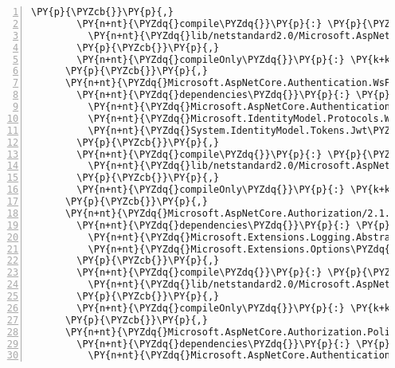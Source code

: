 \begin{Verbatim}[commandchars=\\\{\},numbers=left,firstnumber=1,stepnumber=1,numberblanklines=0]
        \PY{p}{\PYZcb{}}\PY{p}{,}
        \PY{n+nt}{\PYZdq{}compile\PYZdq{}}\PY{p}{:} \PY{p}{\PYZob{}}
          \PY{n+nt}{\PYZdq{}lib/netstandard2.0/Microsoft.AspNetCore.Authentication.Twitter.dll\PYZdq{}}\PY{p}{:} \PY{p}{\PYZob{}}\PY{p}{\PYZcb{}}
        \PY{p}{\PYZcb{}}\PY{p}{,}
        \PY{n+nt}{\PYZdq{}compileOnly\PYZdq{}}\PY{p}{:} \PY{k+kc}{true}
      \PY{p}{\PYZcb{}}\PY{p}{,}
      \PY{n+nt}{\PYZdq{}Microsoft.AspNetCore.Authentication.WsFederation/2.1.0\PYZhy{}rc1\PYZhy{}final\PYZdq{}}\PY{p}{:} \PY{p}{\PYZob{}}
        \PY{n+nt}{\PYZdq{}dependencies\PYZdq{}}\PY{p}{:} \PY{p}{\PYZob{}}
          \PY{n+nt}{\PYZdq{}Microsoft.AspNetCore.Authentication\PYZdq{}}\PY{p}{:} \PY{l+s+s2}{\PYZdq{}2.1.0\PYZhy{}rc1\PYZhy{}final\PYZdq{}}\PY{p}{,}
          \PY{n+nt}{\PYZdq{}Microsoft.IdentityModel.Protocols.WsFederation\PYZdq{}}\PY{p}{:} \PY{l+s+s2}{\PYZdq{}5.2.0\PYZdq{}}\PY{p}{,}
          \PY{n+nt}{\PYZdq{}System.IdentityModel.Tokens.Jwt\PYZdq{}}\PY{p}{:} \PY{l+s+s2}{\PYZdq{}5.2.0\PYZdq{}}
        \PY{p}{\PYZcb{}}\PY{p}{,}
        \PY{n+nt}{\PYZdq{}compile\PYZdq{}}\PY{p}{:} \PY{p}{\PYZob{}}
          \PY{n+nt}{\PYZdq{}lib/netstandard2.0/Microsoft.AspNetCore.Authentication.WsFederation.dll\PYZdq{}}\PY{p}{:} \PY{p}{\PYZob{}}\PY{p}{\PYZcb{}}
        \PY{p}{\PYZcb{}}\PY{p}{,}
        \PY{n+nt}{\PYZdq{}compileOnly\PYZdq{}}\PY{p}{:} \PY{k+kc}{true}
      \PY{p}{\PYZcb{}}\PY{p}{,}
      \PY{n+nt}{\PYZdq{}Microsoft.AspNetCore.Authorization/2.1.0\PYZhy{}rc1\PYZhy{}final\PYZdq{}}\PY{p}{:} \PY{p}{\PYZob{}}
        \PY{n+nt}{\PYZdq{}dependencies\PYZdq{}}\PY{p}{:} \PY{p}{\PYZob{}}
          \PY{n+nt}{\PYZdq{}Microsoft.Extensions.Logging.Abstractions\PYZdq{}}\PY{p}{:} \PY{l+s+s2}{\PYZdq{}2.1.0\PYZhy{}rc1\PYZhy{}final\PYZdq{}}\PY{p}{,}
          \PY{n+nt}{\PYZdq{}Microsoft.Extensions.Options\PYZdq{}}\PY{p}{:} \PY{l+s+s2}{\PYZdq{}2.1.0\PYZhy{}rc1\PYZhy{}final\PYZdq{}}
        \PY{p}{\PYZcb{}}\PY{p}{,}
        \PY{n+nt}{\PYZdq{}compile\PYZdq{}}\PY{p}{:} \PY{p}{\PYZob{}}
          \PY{n+nt}{\PYZdq{}lib/netstandard2.0/Microsoft.AspNetCore.Authorization.dll\PYZdq{}}\PY{p}{:} \PY{p}{\PYZob{}}\PY{p}{\PYZcb{}}
        \PY{p}{\PYZcb{}}\PY{p}{,}
        \PY{n+nt}{\PYZdq{}compileOnly\PYZdq{}}\PY{p}{:} \PY{k+kc}{true}
      \PY{p}{\PYZcb{}}\PY{p}{,}
      \PY{n+nt}{\PYZdq{}Microsoft.AspNetCore.Authorization.Policy/2.1.0\PYZhy{}rc1\PYZhy{}final\PYZdq{}}\PY{p}{:} \PY{p}{\PYZob{}}
        \PY{n+nt}{\PYZdq{}dependencies\PYZdq{}}\PY{p}{:} \PY{p}{\PYZob{}}
          \PY{n+nt}{\PYZdq{}Microsoft.AspNetCore.Authentication.Abstractions\PYZdq{}}\PY{p}{:} \PY{l+s+s2}{\PYZdq{}2.1.0\PYZhy{}rc1\PYZhy{}final\PYZdq{}}\PY{p}{,}

\end{Verbatim}
